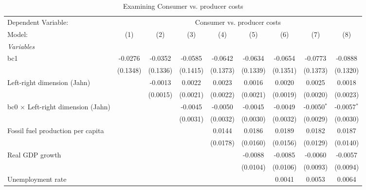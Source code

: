 
\begin{table}[htbp]
   \caption{Examining Consumer vs. producer costs}
   \centering
   \begin{tabular}{lcccccccc}
      \tabularnewline \midrule \midrule
      Dependent Variable: & \multicolumn{8}{c}{Consumer vs. producer costs}\\
      Model:                                    & (1)      & (2)      & (3)      & (4)      & (5)      & (6)      & (7)           & (8)\\  
      \midrule
      \emph{Variables}\\
      bc1                                       & -0.0276  & -0.0352  & -0.0585  & -0.0642  & -0.0634  & -0.0654  & -0.0773       & -0.0888\\   
                                                & (0.1348) & (0.1336) & (0.1415) & (0.1373) & (0.1339) & (0.1351) & (0.1373)      & (0.1320)\\   
      Left-right dimension (Jahn)               &          & -0.0013  & 0.0022   & 0.0023   & 0.0016   & 0.0020   & 0.0025        & 0.0018\\   
                                                &          & (0.0015) & (0.0021) & (0.0022) & (0.0021) & (0.0019) & (0.0020)      & (0.0023)\\   
      bc0 $\times$ Left-right dimension (Jahn)  &          &          & -0.0045  & -0.0050  & -0.0045  & -0.0049  & -0.0050$^{*}$ & -0.0057$^{*}$\\   
                                                &          &          & (0.0031) & (0.0032) & (0.0030) & (0.0032) & (0.0029)      & (0.0030)\\   
      Fossil fuel production per capita         &          &          &          & 0.0144   & 0.0186   & 0.0189   & 0.0182        & 0.0187\\   
                                                &          &          &          & (0.0178) & (0.0160) & (0.0156) & (0.0129)      & (0.0140)\\   
      Real GDP growth                           &          &          &          &          & -0.0088  & -0.0085  & -0.0060       & -0.0057\\   
                                                &          &          &          &          & (0.0104) & (0.0106) & (0.0093)      & (0.0094)\\   
      Unemployment rate                         &          &          &          &          &          & 0.0041   & 0.0053        & 0.0064\\   

\end{tabular}
\end{table}
